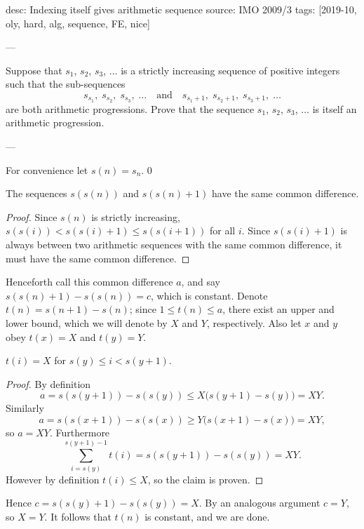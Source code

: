 desc: Indexing itself gives arithmetic sequence
source: IMO 2009/3
tags: [2019-10, oly, hard, alg, sequence, FE, nice]

---

Suppose that $s_1$, $s_2$, $s_3$, $\ldots$ is a strictly increasing sequence of positive integers such that the sub-sequences \[s_{s_1},\; s_{s_2},\; s_{s_3},\; \ldots\quad\text{and}\quad s_{s_1+1},\; s_{s_2+1},\; s_{s_3+1},\; \ldots\]
are both arithmetic progressions. Prove that the sequence $s_1$, $s_2$, $s_3$, $\ldots$ is itself an arithmetic progression.

---

For convenience let $s(n)=s_n$.
\setcounter{claim}0
\begin{claim}
    The sequences $s(s(n))$ and $s(s(n)+1)$ have the same common difference.
\end{claim}
\begin{proof}
    Since $s(n)$ is strictly increasing, $s(s(i))<s(s(i)+1)\le s(s(i+1))$ for all $i$. Since $s(s(i)+1)$ is always between two arithmetic sequences with the same common difference, it must have the same common difference.
\end{proof}

Henceforth call this common difference $a$, and say $s(s(n)+1)-s(s(n))=c$, which is constant. Denote $t(n)=s(n+1)-s(n)$; since $1\le t(n)\le a$, there exist an upper and lower bound, which we will denote by $X$ and $Y$, respectively. Also let $x$ and $y$ obey $t(x)=X$ and $t(y)=Y$.
\begin{claim}
    $t(i)=X$ for $s(y)\le i<s(y+1)$.
\end{claim}
\begin{proof}
    By definition \[a=s(s(y+1))-s(s(y))\le X\big(s(y+1)-s(y)\big)=XY.\]
    Similarly \[a=s(s(x+1))-s(s(x))\ge Y\big(s(x+1)-s(x)\big)=XY,\]
    so $a=XY$. Furthermore \[\sum_{i=s(y)}^{s(y+1)-1}t(i)=s(s(y+1))-s(s(y))=XY.\]
    However by definition $t(i)\le X$, so the claim is proven.
\end{proof}

Hence $c=s(s(y)+1)-s(s(y))=X$. By an analogous argument $c=Y$, so $X=Y$. It follows that $t(n)$ is constant, and we are done.
